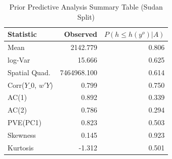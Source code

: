 \begin{table}[!h]
\centering
\caption{Prior Predictive Analysis Summary Table (Sudan Split)}
\label{tab:sudan_ppa}
\centering
\begin{tabular}[t]{lrr}
\toprule
Statistic & Observed & $P(h \leq h(y^{o}) | A)$\\
\midrule
Mean & 2142.779 & 0.806\\
log-Var & 15.666 & 0.625\\
Spatial Quad. & 7464968.100 & 0.614\\
Corr($Y\_0$, $w'Y$) & 0.799 & 0.750\\
AC(1) & 0.892 & 0.339\\
\addlinespace
AC(2) & 0.786 & 0.294\\
PVE(PC1) & 0.823 & 0.503\\
Skewness & 0.145 & 0.923\\
Kurtosis & -1.312 & 0.501\\
\bottomrule
\end{tabular}
\end{table}

